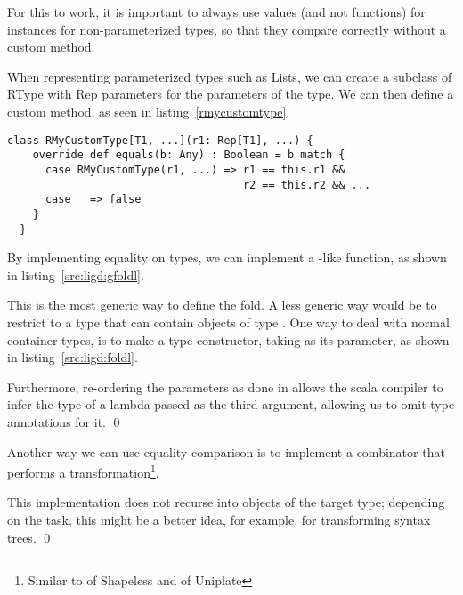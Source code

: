 For this to work, it is important to always use values (and not functions)
for  instances for non-parameterized types, so that they compare
correctly without a custom  method.

When representing parameterized types such as Lists, we can create a subclass
of RType with Rep parameters for the parameters of the type. We can then
define a custom  method, as seen in listing~\ref{rmycustomtype}.

\begin{lstlisting}[float,caption=Pattern for representing parameterized types,label=rmycustomtype]
  class RMyCustomType[T1, ...](r1: Rep[T1], ...) {
    override def equals(b: Any) : Boolean = b match {
      case RMyCustomType(r1, ...) => r1 == this.r1 &&
                                     r2 == this.r2 && ...
      case _ => false
    }
  }
\end{lstlisting}


\begin{example}
  By implementing equality on types, we can implement a -like
  function, as shown in listing~\ref{src:ligd:gfoldl}.

  

  This is the most generic way to define the fold. A less generic way would be
  to restrict  to a type that can contain objects of type . One way
  to deal with normal container types, is to make  a type constructor,
  taking  as its parameter, as shown in listing~\ref{src:ligd:foldl}.

  

  Furthermore, re-ordering the parameters as done in  allows the
  scala compiler to infer the type of a lambda passed as the third argument,
  allowing us to omit type annotations for it. \qed
\end{example}

\begin{example}
  Another way we can use equality comparison is to implement a
  combinator that performs a transformation\footnote{Similar to 
  of Shapeless and  of Uniplate}.

  

  This implementation does not recurse into objects of the target type; depending
  on the task, this might be a better idea, for example, for transforming
  syntax trees. \qed
\end{example}

